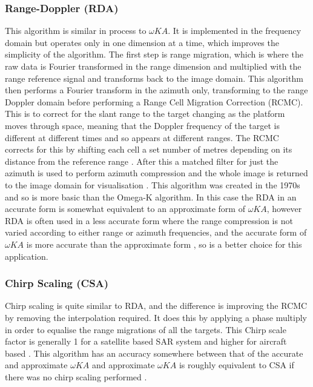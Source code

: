 \subsubsection{Range-Doppler (RDA)}
This algorithm is similar in process to $\omega KA$. It is implemented in the frequency domain but operates only in one dimension at a time, which improves the simplicity of the algorithm. The first step is range migration, which is where the raw data is Fourier transformed in the range dimension and multiplied with the range reference signal and transforms back to the image domain. This algorithm then performs a Fourier transform in the azimuth only, transforming to the range Doppler domain before performing a Range Cell Migration Correction (RCMC). This is to correct for the slant range to the target changing as the platform moves through space, meaning that the Doppler frequency of the target is different at different times and so appears at different ranges. The RCMC corrects for this by shifting each cell a set number of metres depending on its distance from the reference range \cite{parasharStudyRangeCell2015}. After this a matched filter for just the azimuth is used to perform azimuth compression and the whole image is returned to the image domain for visualisation \cite{dastgirProcessingSARData2007}. This algorithm was created in the 1970s and so is more basic than the Omega-K algorithm. In this case the RDA in an accurate form is somewhat equivalent to an approximate form of $\omega KA$, however RDA is often used in a less accurate form where the range compression is not varied according to either range or azimuth frequencies, and the accurate form of $\omega KA$ is more accurate than the approximate form \cite{cummingInterpretationsOmegaKAlgorithm2003}, so is a better choice for this application.
\subsubsection{Chirp Scaling (CSA)}
Chirp scaling is quite similar to RDA, and the difference is improving the RCMC by removing the interpolation required. It does this by applying a phase multiply in order to equalise the range migrations of all the targets. This Chirp scale factor is generally 1 for a satellite based SAR system and higher for aircraft based \cite{dastgirProcessingSARData2007}. This algorithm has an accuracy somewhere between that of the accurate and approximate $\omega KA$ and approximate $\omega KA$ is  roughly equivalent to CSA if there was no chirp scaling performed \cite{cummingInterpretationsOmegaKAlgorithm2003}.
